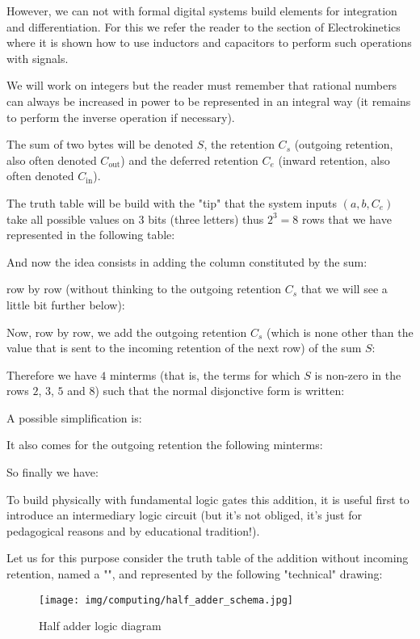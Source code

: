 	However, we can not with formal digital systems build elements for integration and differentiation. For this we refer the reader to the section of Electrokinetics where it is shown how to use inductors and capacitors to perform such operations with signals.

	\begin{tcolorbox}[title=Remark,colframe=black,arc=10pt]
	We will work on integers but the reader must remember that rational numbers can always be increased in power to be represented in an integral way (it remains to perform the inverse operation if necessary).
	\end{tcolorbox}
	The sum of two bytes will be denoted $S$, the retention $C_s$ (outgoing retention, also often denoted $C_\text{out}$) and the deferred retention $C_e$ (inward retention, also often denoted $C_\text{in}$).

	The truth table will be build with the "tip" that the system inputs $(a,b,C_e)$ take all possible values on $3$ bits (three letters) thus $2^3=8$ rows that we have represented in the following table:
	
	And now the idea consists in adding the column constituted by the sum:
	
	row by row (without thinking to the outgoing retention $C_s$ that we will see a little bit further below):
	
	Now, row by row, we add the outgoing retention $C_s$ (which is none other than the value that is sent to the incoming retention of the next row) of the sum $S$:
	
	Therefore we have $4$ minterms (that is, the terms for which $S$ is non-zero in the rows $2$, $3$, $5$ and $8$) such that the normal disjonctive form is written:
	
	A possible simplification is:
	
	It also comes for the outgoing retention the following minterms:
	
	So finally we have:
	
	To build physically with fundamental logic gates this addition, it is useful first to introduce an intermediary logic circuit (but it's not obliged, it's just for pedagogical reasons and by educational tradition!). 
	
	Let us for this purpose consider the truth table of the addition without incoming retention, named a "", and represented by the following "technical" drawing:
	\begin{figure}[H]
		\centering
		\texttt{[image: img/computing/half\_adder\_schema.jpg]}
		\caption{Half adder logic diagram}
	\end{figure}
	
